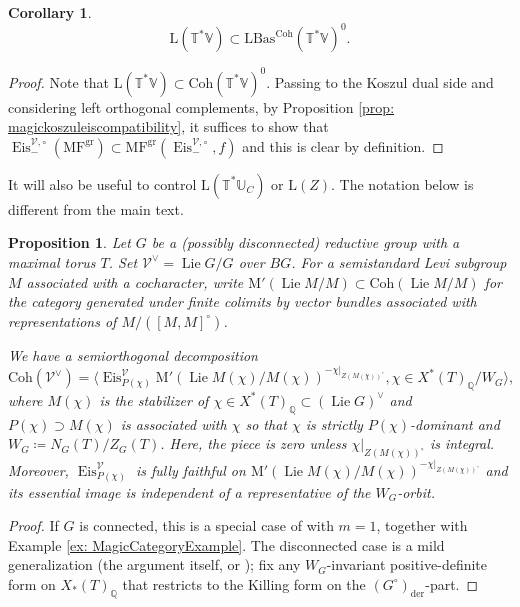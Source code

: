 \documentclass{amsart}
\newtheorem{proposition}[theorem]{Proposition}
\newtheorem{corollary}[theorem]{Corollary}
\theoremstyle{definition}
\theoremstyle{remark}
\numberwithin{equation}{section}
\DeclareMathOperator{\Lie}{Lie}
\newcommand{\U}{\mathbb{U}}
\newcommand{\der}{\mathrm{der}}
\newcommand{\mc}{\mathcal}
\newcommand{\Q}{\mathbb{Q}}
\DeclareMathOperator{\Eis}{\mathrm{Eis}}
\newcommand{\Coh}{\mathrm{Coh}}
\newcommand{\V}{\mathbb{V}}
\newcommand{\T}{\mathbb{T}}
\newcommand{\LBas}{\mathrm{LBas}}
\DeclareMathOperator{\gr}{gr}
\newcommand{\MF}{\mathrm{MF}}
\newcommand{\mrL}{\mathrm{L}}
\newcommand{\M}{\mathrm{M}}
\begin{document}
\begin{corollary}{\label{cor: LimsubsetBas}}
\[
\mrL(\T^*\V) \subset \LBas^{\Coh}(\T^{\ast}\V)^0.
\]
\end{corollary}
\begin{proof}
 Note that $\mrL(\T^*\V)\subset\Coh(\T^*\V)^0$. Passing to the Koszul dual side and considering left orthogonal complements,  by Proposition \ref{prop: magickoszuleiscompatibility}, it suffices to show that $\Eis_{-}^{\mc{V}, \circ}(\MF^{\gr}) \subset \MF^{\gr}(\Eis_{-}^{\mc{V}, \circ}, f)$ and this is clear by definition.
\end{proof}

It will also be useful to control $\mrL  (\T^*\U_C)$ or $\mrL (Z)$. The notation below is different from the main text. 

\begin{proposition}\label{prop: magicategorySOD}
Let $G$ be a (possibly disconnected) reductive group with a maximal torus $T$. Set $\mc V^\vee=\Lie G /G$ over $BG$. For a semistandard Levi subgroup $M$ associated with a cocharacter, write $\M'(\Lie M/M) \subset \Coh(\Lie M/M)$ for the category generated under finite colimits by vector bundles associated with representations of $M/([M, M]^\circ)$. 

We have a semiorthogonal decomposition
\[
\Coh(\mc V^\vee)=\langle \Eis_{P(\chi)}^{\mc V}\M'(\Lie M(\chi)/M(\chi))^{-\chi|_{Z(M(\chi))^\circ}}, \chi \in X^* (T)_\Q / W_G\rangle,
\]
where $M(\chi)$ is the stabilizer of $\chi\in X^*(T)_\Q \subset (\Lie G)^\vee$ and $P(\chi)\supset M(\chi)$ is associated with $\chi$ so that $\chi$ is strictly $P(\chi)$-dominant and $W_G\coloneq N_G (T)/Z_G(T)$. Here, the piece is zero unless $\chi|_{Z(M(\chi))^\circ}$ is integral. Moreover, $\Eis_{P(\chi)}^{\mc V}$ is fully faithful on $\M'(\Lie M(\chi)/M(\chi))^{-\chi|_{Z(M(\chi))^\circ}}$ and its essential image is independent of a representative of the $W_G$-orbit. 
\end{proposition}

\begin{proof}
If $G$ is connected, this is a special case of \cite[\S 2.2.2]{BuPadurariuToda} with $m=1$, together with Example \ref{ex: MagicCategoryExample}. The disconnected case is a mild generalization (the argument itself, or \cite[Theorem 3.2.3]{BuPadurariuToda}); fix any $W_G$-invariant positive-definite form on $X_*(T)_\Q$ that restricts to the Killing form on the $(G^\circ)_\der$-part. 
\end{proof}
\end{document}

